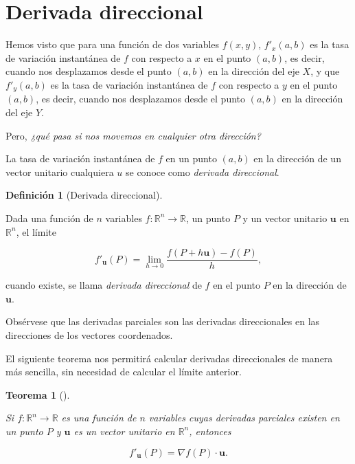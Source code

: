 \documentclass[
  a4paper,
]{scrreport}
\theoremstyle{plain}
\theoremstyle{plain}
\newtheorem{theorem}{Teorema}[chapter]
\theoremstyle{definition}
\newtheorem{definition}{Definición}[chapter]
\theoremstyle{definition}
\theoremstyle{plain}
\theoremstyle{definition}
\theoremstyle{remark}
\begin{document}
\hypertarget{derivada-direccional}{%
\section{Derivada direccional}\label{derivada-direccional}}

Hemos visto que para una función de dos variables \(f(x,y)\),
\(f'_x(a,b)\) es la tasa de variación instantánea de \(f\) con respecto
a \(x\) en el punto \((a,b)\), es decir, cuando nos desplazamos desde el
punto \((a,b)\) en la dirección del eje \(X\), y que \(f'_y(a,b)\) es la
tasa de variación instantánea de \(f\) con respecto a \(y\) en el punto
\((a,b)\), es decir, cuando nos desplazamos desde el punto \((a,b)\) en
la dirección del eje \(Y\).

Pero, \emph{¿qué pasa si nos movemos en cualquier otra dirección?}

La tasa de variación instantánea de \(f\) en un punto \((a,b)\) en la
dirección de un vector unitario cualquiera \(u\) se conoce como
\emph{derivada direccional}.

\begin{definition}[Derivada
direccional]\protect\hypertarget{def-derivada-direccional}{}\label{def-derivada-direccional}

Dada una función de \(n\) variables
\(f:\mathbb{R}^n\rightarrow \mathbb{R}\), un punto \(P\) y un vector
unitario \(\mathbf{u}\) en \(\mathbb{R}^n\), el límite

\[
f'_{\mathbf{u}}(P) = \lim_{h\rightarrow 0}\frac{f(P+h\mathbf{u})-f(P)}{h},
\]

cuando existe, se llama \emph{derivada direccional} de \(f\) en el punto
\(P\) en la dirección de \(\mathbf{u}\).

\end{definition}

Obsérvese que las derivadas parciales son las derivadas direccionales en
las direcciones de los vectores coordenados.

El siguiente teorema nos permitirá calcular derivadas direccionales de
manera más sencilla, sin necesidad de calcular el límite anterior.

\begin{theorem}[]\protect\hypertarget{thm-derivada-direccional}{}\label{thm-derivada-direccional}

Si \(f:\mathbb{R}^n\rightarrow \mathbb{R}\) es una función de \(n\)
variables cuyas derivadas parciales existen en un punto \(P\) y
\(\mathbf{u}\) es un vector unitario en \(\mathbb{R}^n\), entonces

\[
f'_{\mathbf{u}}(P) = \nabla f(P)\cdot \mathbf{u}.
\]

\end{theorem}
\end{document}
